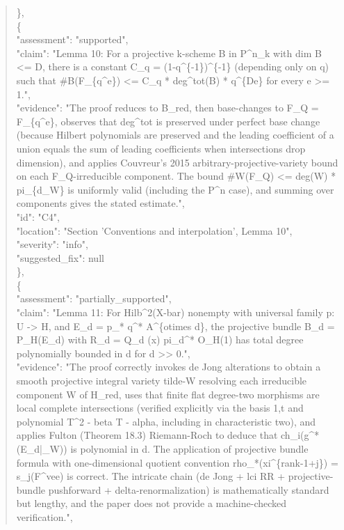 \documentclass[11pt]{article}
\begin{document}
\begin{quote}
    \},\\
    \{\\
      "assessment": "supported",\\
      "claim": "Lemma 10: For a projective k-scheme B in P\^{}n\_k with dim B <= D, there is a constant C\_q = (1-q\^{}\{-1\})\^{}\{-1\} (depending only on q) such that \#B(F\_\{q\^{}e\}) <= C\_q * deg\^{}tot(B) * q\^{}\{De\} for every e >= 1.",\\
      "evidence": "The proof reduces to B\_red, then base-changes to F\_Q = F\_\{q\^{}e\}, observes that deg\^{}tot is preserved under perfect base change (because Hilbert polynomials are preserved and the leading coefficient of a union equals the sum of leading coefficients when intersections drop dimension), and applies Couvreur's 2015 arbitrary-projective-variety bound on each F\_Q-irreducible component. The bound \#W(F\_Q) <= deg(W) * pi\_\{d\_W\} is uniformly valid (including the P\^{}n case), and summing over components gives the stated estimate.",\\
      "id": "C4",\\
      "location": "Section 'Conventions and interpolation', Lemma 10",\\
      "severity": "info",\\
      "suggested\_fix": null\\
    \},\\
    \{\\
      "assessment": "partially\_supported",\\
      "claim": "Lemma 11: For Hilb\^{}2(X-bar) nonempty with universal family p: U -> H, and E\_d = p\_* q\^{}* A\^{}\{otimes d\}, the projective bundle B\_d = P\_H(E\_d) with R\_d = Q\_d (x) pi\_d\^{}* O\_H(1) has total degree polynomially bounded in d for d >> 0.",\\
      "evidence": "The proof correctly invokes de Jong alterations to obtain a smooth projective integral variety tilde-W resolving each irreducible component W of H\_red, uses that finite flat degree-two morphisms are local complete intersections (verified explicitly via the basis 1,t and polynomial T\^{}2 - beta T - alpha, including in characteristic two), and applies Fulton (Theorem 18.3) Riemann-Roch to deduce that ch\_i(g\^{}*(E\_d|\_W)) is polynomial in d. The application of projective bundle formula with one-dimensional quotient convention rho\_*(xi\^{}\{rank-1+j\}) = s\_j(F\^{}vee) is correct. The intricate chain (de Jong + lci RR + projective-bundle pushforward + delta-renormalization) is mathematically standard but lengthy, and the paper does not provide a machine-checked verification.",\\

\end{quote}
\end{document}
